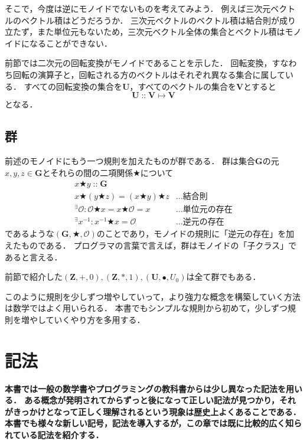 \documentclass[twocolumn]{jsbook}
\newenvironment{leader}{\begingroup\bf}{\endgroup}
\newcommand{\istypeof}{\mathop{::}}
\newcommand{\mathbinaryop}{\bigstar}
\newcommand{\mathidentity}{\mathcal{O}}
\newcommand{\mathsetname}[1]{\boldsymbol{#1}}
\newcommand{\mathtriple}[3]{(#1,#2,#3)}
\newcommand{\mathcompose}{\bullet}
\begin{document}
そこで，今度は逆にモノイドでないものを考えてみよう．
例えば三次元ベクトルのベクトル積はどうだろうか．
三次元ベクトルのベクトル積は結合則が成り立たず，また単位元もないため，三次元ベクトル全体の集合とベクトル積はモノイドになることができない．


前節では二次元の回転変換がモノイドであることを示した．
回転変換，すなわち回転の演算子と，回転される方のベクトルはそれぞれ異なる集合に属している．
すべての回転変換の集合を$\mathsetname{U}$，すべてのベクトルの集合を$\mathsetname{V}$とすると$$\mathsetname{U}\istypeof\mathsetname{V}\mapsto\mathsetname{V}$$となる．



\section{群}
前述のモノイドにもう一つ規則を加えたものが群である．
群は集合$\mathsetname{G}$の元$x,y,z\in\mathsetname{G}$とそれらの間の二項関係$\mathbinaryop$について
\begin{align}
x\mathbinaryop y\istypeof\mathsetname{G}\\
x\mathbinaryop(y\mathbinaryop z)=(x\mathbinaryop y)\mathbinaryop z&\dots\text{結合則}\\
{}^\exists\mathidentity:\mathidentity\mathbinaryop x=x\mathbinaryop\mathidentity=x&\dots\text{単位元の存在}\\
{}^\exists x^{-1}:x^{-1}\mathbinaryop x=\mathidentity&\dots\text{逆元の存在}
\end{align}
であるような$\mathtriple{\mathsetname{G}}{\mathbinaryop}{\mathidentity}$のことであり，モノイドの規則に「逆元の存在」を加えたものである．
プログラマの言葉で言えば，群はモノイドの「子クラス」であると言える．

前節で紹介した$\mathtriple{\mathsetname{Z}}{+}{0},\mathtriple{\mathsetname{Z}}{*}{1},\mathtriple{\mathsetname{U}}{\mathcompose}{U_0}$は全て群でもある．

このように規則を少しずつ増やしていって，より強力な概念を構築していく方法は数学ではよく用いられる．
本書でもシンプルな規則から初めて，少しずつ規則を増やしていくやり方を多用する．


\chapter{記法}

\begin{leader}
本書では一般の数学書やプログラミングの教科書からは少し異なった記法を用いる．
ある概念が発明されてからずっと後になって正しい記法が見つかり，それがきっかけとなって正しく理解されるという現象は歴史上よくあることである．
本書でも様々な新しい記号，記法を導入するが，この章では既に比較的広く知られている記法を紹介する．
\end{leader}
\end{document}
